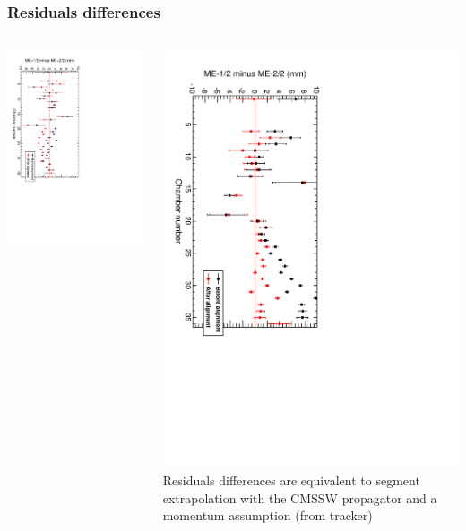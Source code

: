 \documentclass[compress]{beamer}
\begin{document}
\begin{frame}
\frametitle{Residuals differences}

\begin{columns}
\includegraphics[height=\linewidth, angle=90]{endcap_diffplus.pdf}

\includegraphics[height=\linewidth, angle=90]{endcap_diffminus.pdf}
\scriptsize 
Residuals differences are equivalent to segment extrapolation with the CMSSW propagator and a momentum assumption (from tracker)


\end{columns}
\end{frame}
\end{document}
